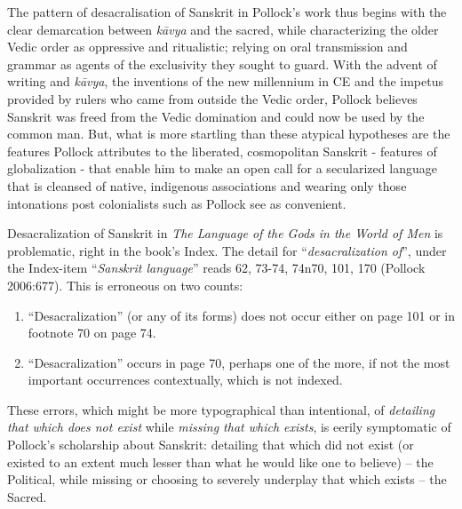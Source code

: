 The pattern of desacralisation of Sanskrit in Pollock’s work thus begins with the clear demarcation between \textit{kāvya} and the sacred, while characterizing the older Vedic order as oppressive and ritualistic; relying on oral transmission and grammar as agents of the exclusivity they sought to guard. With the advent of writing and \textit{kāvya}, the inventions of the new millennium in CE and the impetus provided by rulers who came from outside the Vedic order, Pollock believes Sanskrit was freed from the Vedic domination and could now be used by the common man. But, what is more startling than these atypical hypotheses are the features Pollock attributes to the liberated, cosmopolitan Sanskrit - features of globalization - that enable him to make an open call for a secularized language that is cleansed of native, indigenous associations and wearing only those intonations post colonialists such as Pollock see as convenient.

Desacralization of Sanskrit in \textit{The Language of the Gods in the World of Men} is problematic, right in the book’s Index. The detail for “\textit{desacralization of}”, under the Index-item “\textit{Sanskrit language}” reads 62, 73-74, 74n70, 101, 170 (Pollock 2006:677). This is erroneous on two counts:

\begin{enumerate}
\item “Desacralization” (or any of its forms) does not occur either on page 101 or in footnote 70 on page 74.

 \item “Desacralization” occurs in page 70, perhaps one of the more, if not the most important occurrences contextually, which is not indexed.

\end{enumerate}

These errors, which might be more typographical than intentional, of \textit{detailing that which does not exist} while \textit{missing that which exists}, is eerily symptomatic of Pollock’s scholarship about Sanskrit: detailing that which did not exist (or existed to an extent much lesser than what he would like one to believe) – the Political, while missing\textit{} or choosing to severely underplay that which exists – the Sacred.

